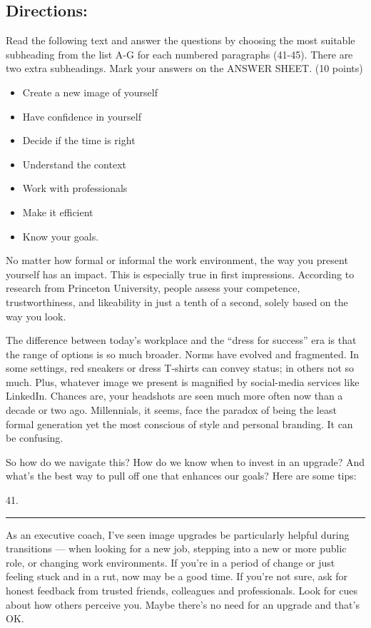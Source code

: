 \documentclass[UTF8,11pt]{ctexart}
\begin{document}
\subsection*{\textbf{Directions:}}


Read the following text and answer the questions by choosing the most suitable subheading from the list A-G for each numbered paragraphs (41-45). There are two extra subheadings. Mark your answers on the ANSWER SHEET. (10 points)


\begin{itemize}[leftmargin=2em,itemsep=.2em,topsep=.4em]\item[A.] Create a new image of yourself
\item[B.] Have confidence in yourself
\item[C.] Decide if the time is right
\item[D.] Understand the context
\item[E.] Work with professionals
\item[F.] Make it efficient
\item[G.] Know your goals.
\end{itemize}

No matter how formal or informal the work environment, the way you present yourself has an impact. This is especially true in first impressions. According to research from Princeton University, people assess your competence, trustworthiness, and likeability in just a tenth of a second, solely based on the way you look.


The difference between today’s workplace and the “dress for success” era is that the range of options is so much broader. Norms have evolved and fragmented. In some settings, red sneakers or dress T-shirts can convey status; in others not so much. Plus, whatever image we present is magnified by social-media services like LinkedIn. Chances are, your headshots are seen much more often now than a decade or two ago. Millennials, it seems, face the paradox of being the least formal generation yet the most conscious of style and personal branding. It can be confusing.


So how do we navigate this? How do we know when to invest in an upgrade? And what’s the best way to pull off one that enhances our goals? Here are some tips:


41. \par\noindent\rule{.95\linewidth}{.4pt}\par


As an executive coach, I’ve seen image upgrades be particularly helpful during transitions — when looking for a new job, stepping into a new or more public role, or changing work environments. If you’re in a period of change or just feeling stuck and in a rut, now may be a good time. If you’re not sure, ask for honest feedback from trusted friends, colleagues and professionals. Look for cues about how others perceive you. Maybe there’s no need for an upgrade and that’s OK.
\end{document}

